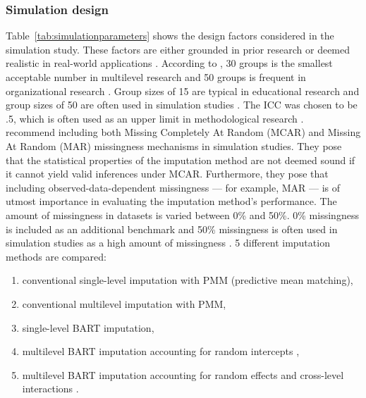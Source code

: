 \documentclass[10pt, a4paper, titlepage]{article}
\begin{document}
\subsubsection{Simulation design} \label{sec:simulation}
Table~\ref{tab:simulationparameters} shows the design factors considered in the simulation study. These factors are either grounded in prior research or deemed realistic in real-world applications \citep{gulliford1999, murray2003, hox2017, grund2018, enders2018a, enders2020}. According to \citet{kreft2007}, 30 groups is the smallest acceptable number in multilevel research and 50 groups is frequent in organizational research \citep{maas2005}. Group sizes of 15 are typical in educational research \citep{ludtke2017} and group sizes of 50 are often used in simulation studies \citep{maas2005,enders2018,akkayahocagil2023,grund2018,enders2018a,enders2020}. The ICC was chosen to be .5, which is often used as an upper limit in methodological research \citep{enders2020,enders2018,enders2018a,mistler2017,grund2018,salditt2023}.~\citet{oberman2023} recommend including both Missing Completely At Random (MCAR) and Missing At Random (MAR) missingness mechanisms in simulation studies. They pose that the statistical properties of the imputation method are not deemed sound if it cannot yield valid inferences under MCAR. Furthermore, they pose that including observed-data-dependent missingness --- for example, MAR --- is of utmost importance in evaluating the imputation method's performance. The amount of missingness in datasets is varied between 0\% and 50\%. 0\% missingness is included as an additional benchmark and 50\% missingness is often used in simulation studies as a high amount of missingness \citep{ludtke2017,grund2016,schouten2021}. 5 different imputation methods are compared: 
\begin{enumerate}
    \item conventional single-level imputation with PMM (predictive mean matching),
    \item conventional multilevel imputation with PMM,
    \item single-level BART imputation,
    \item multilevel BART imputation accounting for random intercepts \citep{chen2020, wagner2020, tan2016},
    \item multilevel BART imputation accounting for random effects and cross-level interactions \citep{dorie2022}.
\end{enumerate} 
\end{document}
